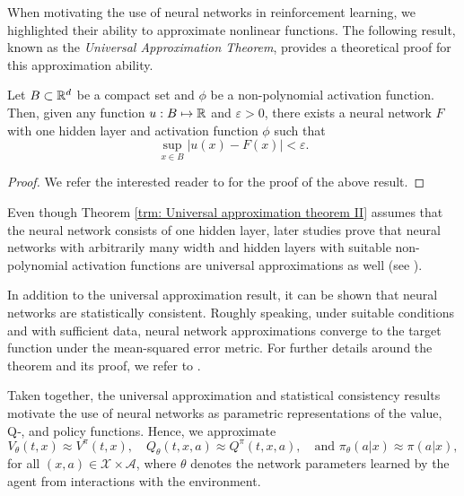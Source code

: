When motivating the use of neural networks in reinforcement learning, we highlighted their ability to approximate nonlinear functions. The following result, known as the \emph{Universal Approximation Theorem}, provides a theoretical proof for this  approximation ability.
\begin{theorem}
\label{trm: Universal approximation theorem II}
    Let $B \subset \mathbb{R}^d$ be a compact set and $\phi$ be a non-polynomial activation function. Then, given any function $u: B \mapsto \mathbb{R}$ and $\varepsilon>0$, there exists a neural network $F$ with one hidden layer and activation function $\phi$ such that 
    \begin{equation*}
        \sup_{x \in B} |u(x) - F(x)| < \varepsilon. 
    \end{equation*}
\end{theorem}
\begin{proof}
    We refer the interested reader to \cite{leshno1993multilayer} for the proof of the above result.
\end{proof}
\begin{remark}
    Even though Theorem \ref{trm: Universal approximation theorem II} assumes that the neural network consists of one hidden layer, later studies prove that neural networks with arbitrarily many width and hidden layers with suitable non-polynomial activation functions are universal approximations as well (see \cite{park1991universal, guliyev2018approximation}).
\end{remark}    

In addition to the universal approximation result, it can be shown that neural networks are statistically consistent. Roughly speaking, under suitable conditions and with sufficient data, neural network approximations converge to the target function under the mean-squared error metric. For further details around the theorem and its proof, we refer to \cite{barron1994approximation, zhan2024consistency}.

Taken together, the universal approximation and statistical consistency results motivate the use of neural networks as parametric representations of the value, Q‑, and policy functions. Hence, we approximate
\begin{equation*}
    V_\theta(t,x) \approx V^\pi(t,x), \quad Q_\theta(t,x,a) \approx Q^\pi(t,x,a), \quad \text{and } \pi_\theta(a|x) \approx \pi(a|x),
\end{equation*}
for all $(x,a) \in \mathcal{X} \times \mathcal{A}$, where $\theta$ denotes the network parameters learned by the agent from interactions with the environment. 

